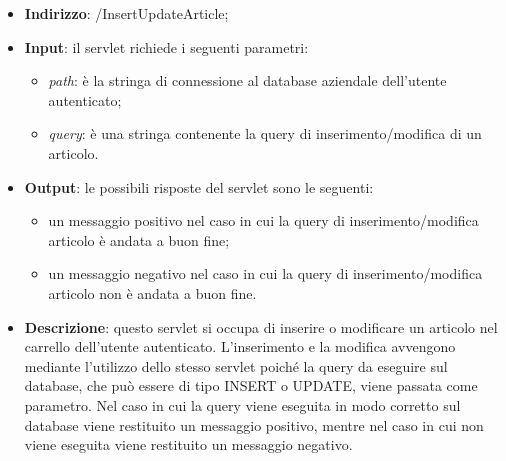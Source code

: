 \begin{itemize}
	\item \textbf{Indirizzo}: /InsertUpdateArticle;
	\item \textbf{Input}: il servlet richiede i seguenti parametri:
		\begin{itemize}
			\item \textit{path}: è la stringa di connessione al database aziendale dell'utente autenticato;
			\item \textit{query}: è una stringa contenente la query di inserimento/modifica di un articolo.
		\end{itemize}
	\item \textbf{Output}: le possibili risposte del servlet sono le seguenti:
		\begin{itemize}
			\item un messaggio positivo nel caso in cui la query di inserimento/modifica articolo è andata a buon fine;
			\item un messaggio negativo nel caso in cui la query di inserimento/modifica articolo non è andata a buon fine.
		\end{itemize}
	\item \textbf{Descrizione}: questo servlet si occupa di inserire o modificare un articolo nel carrello dell'utente autenticato. L'inserimento e la modifica avvengono mediante l'utilizzo dello stesso servlet poiché la query da eseguire sul database, che può essere di tipo INSERT o UPDATE, viene passata come parametro. Nel caso in cui la query viene eseguita in modo corretto sul database viene restituito un messaggio positivo, mentre nel caso in cui non viene eseguita viene restituito un messaggio negativo.
\end{itemize}


